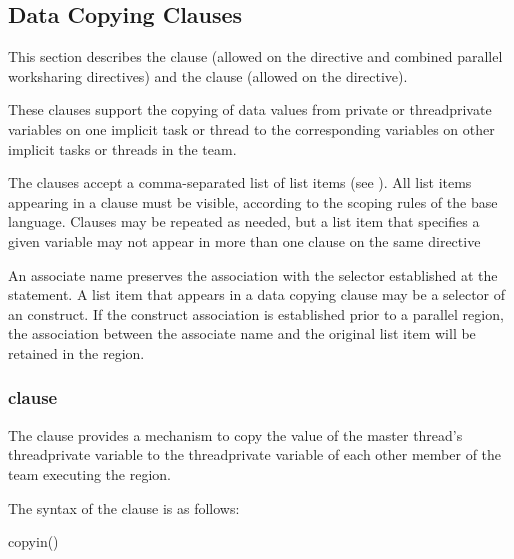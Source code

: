 \subsection{Data Copying Clauses}
\label{subsec:Data Copying Clauses}
This section describes the  clause (allowed on the  directive and 
combined parallel worksharing directives) and the  clause (allowed on 
the  directive).

These clauses support the copying of data values from private or threadprivate variables 
on one implicit task or thread to the corresponding variables on other implicit tasks or 
threads in the team.

The clauses accept a comma-separated list of list items (see ). 
All list items appearing in a clause must be visible, according to the scoping rules of the 
base language. Clauses may be repeated as needed, but a list item that specifies a given 
variable may not appear in more than one clause on the same directive

\fortranspecificstart
An associate name preserves the association with the selector established at the  statement. A list item that appears in a data copying clause may be a selector of an  construct. If the construct association is established prior to a parallel region, the association between the associate name and the original list item will be retained in the region.
\fortranspecificend







\subsubsection{ clause}
\label{subsubsec:copyin clause}
\summary
The  clause provides a mechanism to copy the value of the master thread’s 
threadprivate variable to the threadprivate variable of each other member of the team 
executing the  region. 

\syntax
The syntax of the  clause is as follows:

\begin{boxedcode}
copyin()
\end{boxedcode}

